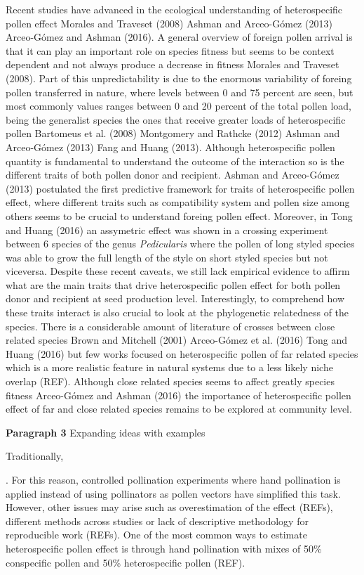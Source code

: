 \documentclass[11pt,a4paper]{article}
\begin{document}
Recent studies have advanced in the ecological understanding of
heterospecific pollen effect Morales and Traveset (2008) Ashman and
Arceo-Gómez (2013) Arceo-Gómez and Ashman (2016). A general overview of
foreign pollen arrival is that it can play an important role on species
fitness but seems to be context dependent and not always produce a
decrease in fitness Morales and Traveset (2008). Part of this
unpredictability is due to the enormous variability of foreing pollen
transferred in nature, where levels between 0 and 75 percent are seen,
but most commonly values ranges between 0 and 20 percent of the total
pollen load, being the generalist species the ones that receive greater
loads of heterospecific pollen Bartomeus et al. (2008) Montgomery and
Rathcke (2012) Ashman and Arceo-Gómez (2013) Fang and Huang (2013).
Although heterospecific pollen quantity is fundamental to understand the
outcome of the interaction so is the different traits of both pollen
donor and recipient. Ashman and Arceo-Gómez (2013) postulated the first
predictive framework for traits of heterospecific pollen effect, where
different traits such as compatibility system and pollen size among
others seems to be crucial to understand foreing pollen effect.
Moreover, in Tong and Huang (2016) an assymetric effect was shown in a
crossing experiment between 6 species of the genus \emph{Pedicularis}
where the pollen of long styled species was able to grow the full length
of the style on short styled species but not viceversa. Despite these
recent caveats, we still lack empirical evidence to affirm what are the
main traits that drive heterospecific pollen effect for both pollen
donor and recipient at seed production level. Interestingly, to
comprehend how these traits interact is also crucial to look at the
phylogenetic relatedness of the species. There is a considerable amount
of literature of crosses between close related species Brown and
Mitchell (2001) Arceo-Gómez et al. (2016) Tong and Huang (2016) but few
works focused on heterospecific pollen of far related species which is a
more realistic feature in natural systems due to a less likely niche
overlap (REF). Although close related species seems to affect greatly
species fitness Arceo-Gómez and Ashman (2016) the importance of
heterospecific pollen effect of far and close related species remains to
be explored at community level.

\textbf{Paragraph 3} Expanding ideas with examples

Traditionally,

. For this reason, controlled pollination experiments where hand
pollination is applied instead of using pollinators as pollen vectors
have simplified this task. However, other issues may arise such as
overestimation of the effect (REFs), different methods across studies or
lack of descriptive methodology for reproducible work (REFs). One of the
most common ways to estimate heterospecific pollen effect is through
hand pollination with mixes of 50\% conspecific pollen and 50\%
heterospecific pollen (REF).
\end{document}
